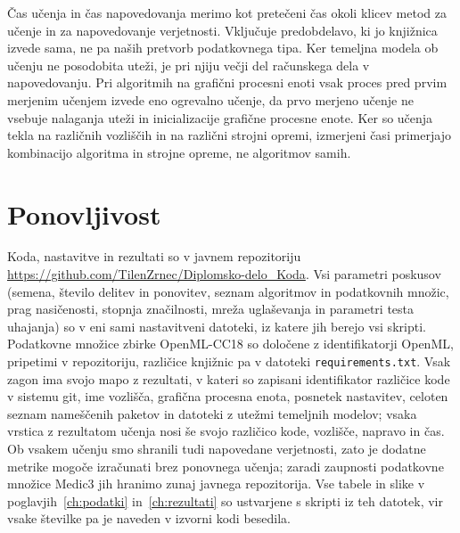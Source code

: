 \documentclass[a4paper,12pt,openright]{book}
\begin{document}
Čas učenja in čas napovedovanja merimo kot pretečeni čas okoli klicev metod za
učenje in za napovedovanje verjetnosti. Vključuje predobdelavo, ki jo knjižnica
izvede sama, ne pa naših pretvorb podatkovnega tipa. Ker temeljna modela ob
učenju ne posodobita uteži, je pri njiju večji del računskega dela v
napovedovanju. Pri algoritmih na
grafični procesni enoti vsak proces pred prvim merjenim učenjem izvede eno
ogrevalno učenje, da prvo merjeno učenje ne vsebuje nalaganja uteži in
inicializacije grafične procesne enote. Ker so učenja tekla na različnih
vozliščih in na različni strojni opremi, izmerjeni časi primerjajo kombinacijo
algoritma in strojne opreme, ne algoritmov samih.

\section{Ponovljivost}
\label{sec:ponovljivost}

Koda, nastavitve in rezultati so v javnem repozitoriju
\url{https://github.com/TilenZrnec/Diplomsko-delo_Koda}. Vsi parametri
poskusov (semena, število delitev in ponovitev, seznam algoritmov in
podatkovnih množic, prag nasičenosti, stopnja značilnosti, mreža uglaševanja in
parametri testa uhajanja) so v eni sami nastavitveni datoteki, iz katere jih
berejo vsi skripti. Podatkovne množice zbirke OpenML-CC18 so določene z
identifikatorji OpenML, pripetimi v repozitoriju, različice knjižnic pa v
datoteki \texttt{requirements.txt}. Vsak zagon ima svojo mapo z rezultati, v
kateri so zapisani identifikator različice kode v sistemu git, ime vozlišča,
grafična procesna enota, posnetek nastavitev, celoten seznam nameščenih paketov in
datoteki z utežmi temeljnih modelov; vsaka vrstica z rezultatom učenja nosi še
svojo različico kode, vozlišče, napravo in čas. Ob vsakem učenju smo shranili
tudi napovedane verjetnosti, zato je dodatne metrike mogoče izračunati brez
ponovnega učenja; zaradi zaupnosti podatkovne množice Medic3 jih hranimo
zunaj javnega repozitorija. Vse tabele in slike v poglavjih~\ref{ch:podatki}
in~\ref{ch:rezultati} so ustvarjene s skripti iz teh datotek, vir vsake
številke pa je naveden v izvorni kodi besedila.
\end{document}
